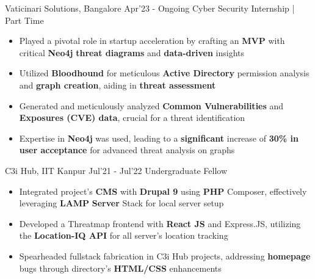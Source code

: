 \excventry
{Vaticinari Solutions, Bangalore}
{Apr'23 - Ongoing}
{Cyber Security Internship | Part Time}
{
  \begin{itemize}
    \item Played a pivotal role in startup acceleration by crafting an \textbf{MVP} with  critical \textbf{Neo4j} \textbf{threat diagrams} and \textbf{data-driven} insights
    \item Utilized \textbf{Bloodhound} for meticulous \textbf{Active Directory} permission analysis and \textbf{graph creation}, aiding in \textbf{threat assessment}
    \item Generated and meticulously analyzed \textbf{Common Vulnerabilities} and \textbf{Exposures (CVE) data}, crucial for a threat identification
    \item Expertise in\textbf{ Neo4j} was used, leading to a \textbf{significant} increase of \textbf{30\% in user acceptance} for advanced threat analysis on graphs

  \end{itemize}
}

\excventry
{C3i Hub, IIT Kanpur}
{Jul'21 - Jul'22}
{Undergraduate Fellow }
{
  \begin{itemize}
    \item Integrated project’s \textbf{CMS} with \textbf{Drupal 9} using \textbf{PHP} Composer, effectively leveraging \textbf{LAMP} \textbf{Server} Stack for local server setup
    \item Developed a Threatmap frontend with \textbf{React JS} and Express.JS, utilizing the \textbf{Location-IQ API} for all server's location tracking
    \item Spearheaded fullstack fabrication in C3i Hub projects, addressing \textbf{homepage} bugs through directory's \textbf{HTML/CSS} enhancements
  \end{itemize}
}

\vspace{-2mm}